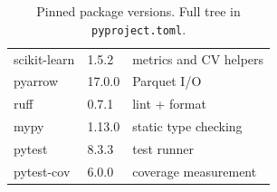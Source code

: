 \documentclass[11pt,a4paper]{article}
\newcommand{\code}[1]{\texttt{\small #1}}
\begin{document}
\begin{table}[H]
\begin{tabularx}{\linewidth}{@{}l l X@{}}
scikit-learn          & 1.5.2               & metrics and CV helpers \\
pyarrow               & 17.0.0              & Parquet I/O \\
ruff                  & 0.7.1               & lint + format \\
mypy                  & 1.13.0              & static type checking \\
pytest                & 8.3.3               & test runner \\
pytest-cov            & 6.0.0               & coverage measurement \\
\bottomrule
\end{tabularx}
\caption{Pinned package versions. Full tree in \code{pyproject.toml}.}
\label{tab:packages}
\end{table}
\end{document}

